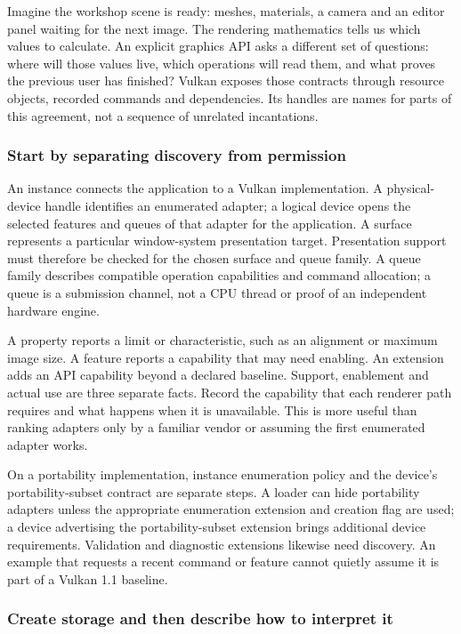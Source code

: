 Imagine the workshop scene is ready: meshes, materials, a camera and an editor panel waiting for the next image. The rendering mathematics tells us which values to calculate. An explicit graphics API asks a different set of questions: where will those values live, which operations will read them, and what proves the previous user has finished? Vulkan exposes those contracts through resource objects, recorded commands and dependencies. Its handles are names for parts of this agreement, not a sequence of unrelated incantations.

\subsubsection{Start by separating discovery from permission}\label{05-engine-i-ch019-start-by-separating-discovery-from-permission}

An instance connects the application to a Vulkan implementation. A physical-device handle identifies an enumerated adapter; a logical device opens the selected features and queues of that adapter for the application. A surface represents a particular window-system presentation target. Presentation support must therefore be checked for the chosen surface and queue family. A queue family describes compatible operation capabilities and command allocation; a queue is a submission channel, not a CPU thread or proof of an independent hardware engine.

A property reports a limit or characteristic, such as an alignment or maximum image size. A feature reports a capability that may need enabling. An extension adds an API capability beyond a declared baseline. Support, enablement and actual use are three separate facts. Record the capability that each renderer path requires and what happens when it is unavailable. This is more useful than ranking adapters only by a familiar vendor or assuming the first enumerated adapter works.

On a portability implementation, instance enumeration policy and the device's portability-subset contract are separate steps. A loader can hide portability adapters unless the appropriate enumeration extension and creation flag are used; a device advertising the portability-subset extension brings additional device requirements. Validation and diagnostic extensions likewise need discovery. An example that requests a recent command or feature cannot quietly assume it is part of a Vulkan 1.1 baseline.

\subsubsection{Create storage and then describe how to interpret it}\label{05-engine-i-ch019-create-storage-and-then-describe-how-to-interpret-it}

